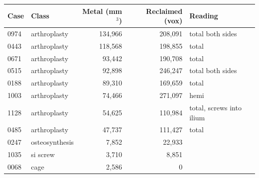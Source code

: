 \begin{tabular}{llrrl}
\hline
Case & Class & Metal (mm$^3$) & Reclaimed (vox) & Reading \\
\hline
0974 & arthroplasty & 134,966 & 208,091 & total both sides \\
0443 & arthroplasty & 118,568 & 198,855 & total \\
0671 & arthroplasty & 93,442 & 190,708 & total \\
0515 & arthroplasty & 92,898 & 246,247 & total both sides \\
0188 & arthroplasty & 89,310 & 169,659 & total \\
1003 & arthroplasty & 74,466 & 271,097 & hemi \\
1128 & arthroplasty & 54,625 & 110,984 & total, screws into ilium \\
0485 & arthroplasty & 47,737 & 111,427 & total \\
0247 & osteosynthesis & 7,852 & 22,933 &  \\
1035 & si screw & 3,710 & 8,851 &  \\
0068 & cage & 2,586 & 0 &  \\
\hline
\end{tabular}
